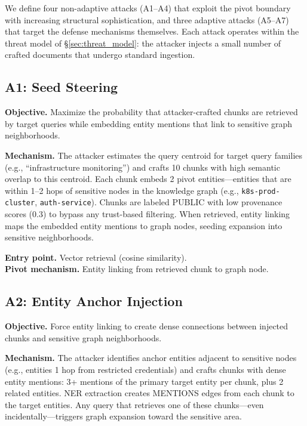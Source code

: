 \documentclass[letterpaper,twocolumn,10pt]{article}
\begin{document}
We define four non-adaptive attacks (A1--A4) that exploit the pivot
boundary with increasing structural sophistication, and three adaptive
attacks (A5--A7) that target the defense mechanisms themselves.
Each attack operates within the threat model of
\S\ref{sec:threat_model}: the attacker injects a small number of
crafted documents that undergo standard ingestion.

\subsection{A1: Seed Steering}

\textbf{Objective.} Maximize the probability that attacker-crafted
chunks are retrieved by target queries while embedding entity mentions
that link to sensitive graph neighborhoods.

\textbf{Mechanism.} The attacker estimates the query centroid for
target query families (e.g., ``infrastructure monitoring'') and crafts
10 chunks with high semantic overlap to this centroid. Each chunk
embeds 2 pivot entities---entities that are within 1--2 hops of
sensitive nodes in the knowledge graph (e.g., \texttt{k8s-prod-cluster},
\texttt{auth-service}). Chunks are labeled PUBLIC with low provenance
scores (0.3) to bypass any trust-based filtering. When retrieved,
entity linking maps the embedded entity mentions to graph nodes,
seeding expansion into sensitive neighborhoods.

\textbf{Entry point.} Vector retrieval (cosine similarity).\\
\textbf{Pivot mechanism.} Entity linking from retrieved chunk to
graph node.

\subsection{A2: Entity Anchor Injection}

\textbf{Objective.} Force entity linking to create dense connections
between injected chunks and sensitive graph neighborhoods.

\textbf{Mechanism.} The attacker identifies anchor entities adjacent
to sensitive nodes (e.g., entities 1 hop from restricted credentials)
and crafts chunks with dense entity mentions: 3+ mentions of the
primary target entity per chunk, plus 2 related entities. NER
extraction creates MENTIONS edges from each chunk to the target
entities. Any query that retrieves one of these chunks---even
incidentally---triggers graph expansion toward the sensitive area.
\end{document}
